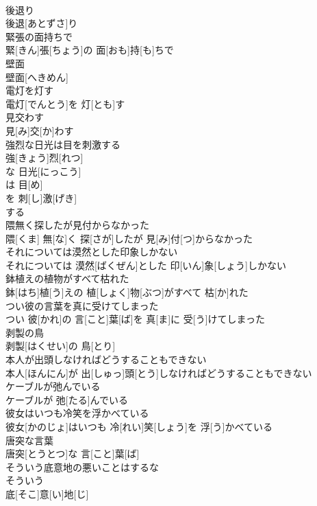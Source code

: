 \documentclass[8pt]{extreport}
\begin{document}
\begin{CJK}{UTF8}{min}
\\	後退り	
\\	後退[あとずさ]り
\\	緊張の面持ちで	
\\	緊[きん]張[ちょう]の 面[おも]持[も]ちで
\\	壁面	
\\	壁面[へきめん]
\\	電灯を灯す	
\\	電灯[でんとう]を 灯[とも]す
\\	見交わす	
\\	見[み]交[か]わす
\\	強烈な日光は目を刺激する	
\\	強[きょう]烈[れつ]
\\	な 日光[にっこう]
\\	は 目[め]
\\	を 刺[し]激[げき]
\\	する
\\	隈無く探したが見付からなかった	
\\	隈[くま] 無[な]く 探[さが]したが 見[み]付[つ]からなかった
\\	それについては漠然とした印象しかない	
\\	それについては 漠然[ばくぜん]とした 印[いん]象[しょう]しかない
\\	鉢植えの植物がすべて枯れた	
\\	鉢[はち]植[う]えの 植[しょく]物[ぶつ]がすべて 枯[か]れた
\\	つい彼の言葉を真に受けてしまった	
\\	つい 彼[かれ]の 言[こと]葉[ば]を 真[ま]に 受[う]けてしまった
\\	剥製の鳥	
\\	剥製[はくせい]の 鳥[とり]
\\	本人が出頭しなければどうすることもできない	
\\	本人[ほんにん]が 出[しゅっ]頭[とう]しなければどうすることもできない
\\	ケーブルが弛んでいる	
\\	ケーブルが 弛[たる]んでいる
\\	彼女はいつも冷笑を浮かべている	
\\	彼女[かのじょ]はいつも 冷[れい]笑[しょう]を 浮[う]かべている
\\	唐突な言葉	
\\	唐突[とうとつ]な 言[こと]葉[ば]
\\	そういう底意地の悪いことはするな	
\\	そういう 
\\	底[そこ]意[い]地[じ]

\end{CJK}
\end{document}
